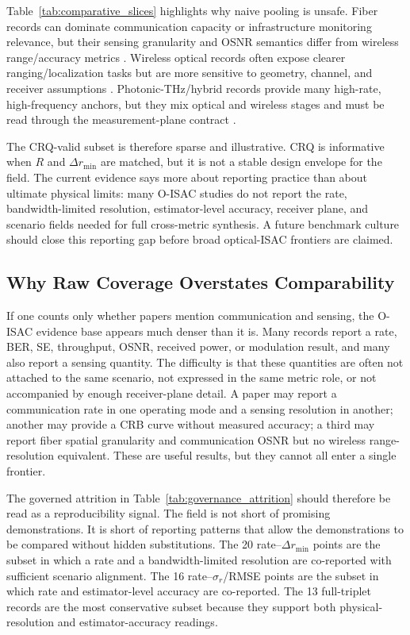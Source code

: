 \documentclass[letterpaper,journal]{IEEEtran}
\begin{document}
Table~\ref{tab:comparative_slices} highlights why naive pooling is unsafe. Fiber records can dominate communication capacity or infrastructure monitoring relevance, but their sensing granularity and OSNR semantics differ from wireless range/accuracy metrics \cite{O_ISAC_038,O_ISAC_041,O_ISAC_046,O_ISAC_069,O_ISAC_074}. Wireless optical records often expose clearer ranging/localization tasks but are more sensitive to geometry, channel, and receiver assumptions \cite{O_ISAC_003,O_ISAC_005,O_ISAC_023,O_ISAC_035,O_ISAC_039,O_ISAC_048}. Photonic-THz/hybrid records provide many high-rate, high-frequency anchors, but they mix optical and wireless stages and must be read through the measurement-plane contract \cite{O_ISAC_026,O_ISAC_029,O_ISAC_047,O_ISAC_065,O_ISAC_077,O_ISAC_105}.

The CRQ-valid subset is therefore sparse and illustrative. CRQ is informative when \(R\) and \(\Delta r_{\min}\) are matched, but it is not a stable design envelope for the field. The current evidence says more about reporting practice than about ultimate physical limits: many O-ISAC studies do not report the rate, bandwidth-limited resolution, estimator-level accuracy, receiver plane, and scenario fields needed for full cross-metric synthesis. A future benchmark culture should close this reporting gap before broad optical-ISAC frontiers are claimed.

\subsection{Why Raw Coverage Overstates Comparability}

If one counts only whether papers mention communication and sensing, the O-ISAC evidence base appears much denser than it is. Many records report a rate, BER, SE, throughput, OSNR, received power, or modulation result, and many also report a sensing quantity. The difficulty is that these quantities are often not attached to the same scenario, not expressed in the same metric role, or not accompanied by enough receiver-plane detail. A paper may report a communication rate in one operating mode and a sensing resolution in another; another may provide a CRB curve without measured accuracy; a third may report fiber spatial granularity and communication OSNR but no wireless range-resolution equivalent. These are useful results, but they cannot all enter a single frontier.

The governed attrition in Table~\ref{tab:governance_attrition} should therefore be read as a reproducibility signal. The field is not short of promising demonstrations. It is short of reporting patterns that allow the demonstrations to be compared without hidden substitutions. The 20 rate--\(\Delta r_{\min}\) points are the subset in which a rate and a bandwidth-limited resolution are co-reported with sufficient scenario alignment. The 16 rate--\(\sigma_r\)/RMSE points are the subset in which rate and estimator-level accuracy are co-reported. The 13 full-triplet records are the most conservative subset because they support both physical-resolution and estimator-accuracy readings.
\end{document}

